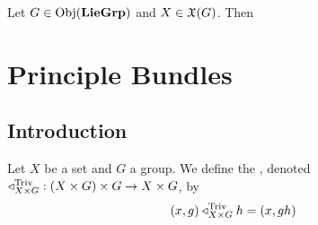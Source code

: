 \documentclass{book}
\begin{document}
\begin{ex}
	Let $G \in \operatorname{Obj}(\operatorname*{\text{\textbf{LieGrp}}})$ and $X \in \mathfrak{X}(G)$. Then  
\end{ex}





















































































\newpage
\chapter{Principle Bundles}

\section{Introduction}


\begin{defn}
	Let $X$ be a set and $G$ a group. We define the , denoted $\triangleleft^{\text{Triv}}_{X \times G}: (X \times G) \times G \rightarrow X \times G$, by 
	$$(x,g) \triangleleft^{\text{Triv}}_{X \times G} h = (x, gh)$$
\end{defn}
\end{document}
